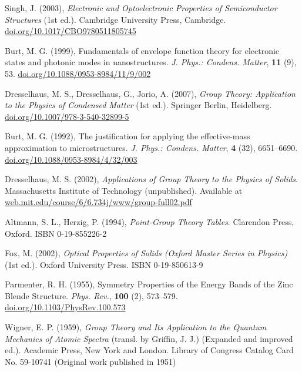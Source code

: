 \documentclass[12pt]{report}
\begin{document}
\begin{thebibliography}{10}
Singh, J. (2003), \textit{Electronic and Optoelectronic Properties of Semiconductor Structures} (1st ed.). Cambridge University Press, Cambridge. \href{https://doi.org/10.1017/CBO9780511805745}{doi.org/10.1017/CBO9780511805745}

Burt, M. G. (1999), Fundamentals of envelope function theory for electronic states and photonic modes in nanostructures. \textit{J. Phys.: Condens. Matter}, \textbf{11} (9), 53. \href{https://doi.org/10.1088/0953-8984/11/9/002}{doi.org/10.1088/0953-8984/11/9/002}

Dresselhaus, M. S., Dresselhaus, G., Jorio, A. (2007), \textit{Group Theory: Application to the Physics of Condensed Matter} (1st ed.). Springer Berlin, Heidelberg. \href{https://doi.org/10.1007/978-3-540-32899-5}{doi.org/10.1007/978-3-540-32899-5}

Burt, M. G. (1992), The justification for applying the effective-mass approximation to microstructures. \textit{J. Phys.: Condens. Matter}, \textbf{4} (32), 6651--6690. \href{https://doi.org/10.1088/0953-8984/4/32/003}{doi.org/10.1088/0953-8984/4/32/003}

Dresselhaus, M. S. (2002), \textit{Applications of Group Theory to the Physics of Solids}. Massachusetts Institute of Technology (unpublished). Available at \href{http://web.mit.edu/course/6/6.734j/www/group-full02.pdf}{web.mit.edu/course/6/6.734j/www/group-full02.pdf}

Altmann, S. L., Herzig, P. (1994), \textit{Point-Group Theory Tables}. Clarendon Press, Oxford. ISBN 0-19-855226-2

Fox, M. (2002), \textit{Optical Properties of Solids (Oxford Master Series in Physics)} (1st ed.). Oxford University Press. ISBN 0-19-850613-9

Parmenter, R. H. (1955), Symmetry Properties of the Energy Bands of the Zinc Blende Structure. \textit{Phys. Rev.}, \textbf{100} (2), 573--579. \href{https://doi.org/10.1103/PhysRev.100.573}{doi.org/10.1103/PhysRev.100.573}

Wigner, E. P. (1959), \textit{Group Theory and Its Application to the Quantum Mechanics of Atomic Spectra} (transl. by Griffin, J. J.) (Expanded and improved ed.). Academic Press, New York and London. Library of Congress Catalog Card No. 59-10741 (Original work published in 1951)


\end{thebibliography}
\end{document}
